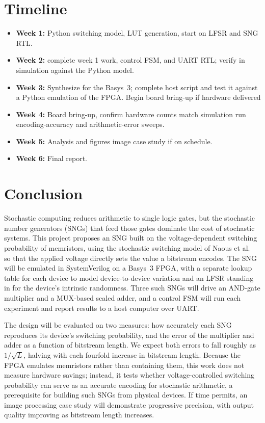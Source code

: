 \documentclass[conference]{IEEEtran}
\begin{document}
\newpage
\section{Timeline}
\begin{itemize}
  \item \textbf{Week 1:} Python switching model, LUT generation, start on  LFSR 
      and SNG RTL.
  \item \textbf{Week 2:} complete week 1 work, control FSM, and UART RTL;
        verify in simulation against the Python model.
  \item \textbf{Week 3:} Synthesize for the Basys~3; complete host script
        and test it against a Python emulation of the FPGA. Begin board
        bring-up if hardware delivered
  \item \textbf{Week 4:} Board bring-up, confirm hardware counts match
        simulation run encoding-accuracy and arithmetic-error sweeps.
  \item \textbf{Week 5:} Analysis and figures image case study if on
        schedule.
  \item \textbf{Week 6:} Final report.
\end{itemize}

\section{Conclusion}
Stochastic computing reduces arithmetic to single logic gates, but the
stochastic number generators (SNGs) that feed those gates dominate the cost
of stochastic systems. This project proposes an SNG built on the
voltage-dependent switching probability of memristors, using the stochastic
switching model of Naous et al.~\cite{memristor_stochasticity} so that the
applied voltage directly sets the value a bitstream encodes. The SNG will be
emulated in SystemVerilog on a Basys~3 FPGA, with a separate lookup table
for each device to model device-to-device variation and an LFSR standing in
for the device's intrinsic randomness. Three such SNGs will drive an
AND-gate multiplier and a MUX-based scaled adder, and a control FSM will run
each experiment and report results to a host computer over UART.

The design will be evaluated on two measures: how accurately each SNG
reproduces its device's switching probability, and the error of the
multiplier and adder as a function of bitstream length. We expect both
errors to fall roughly as $1/\sqrt{L}$, halving with each fourfold increase
in bitstream length. Because the FPGA emulates memristors rather than
containing them, this work does not measure hardware savings; instead, it
tests whether voltage-controlled switching probability can serve as an
accurate encoding for stochastic arithmetic, a prerequisite for building
such SNGs from physical devices. If time permits, an image processing case
study will demonstrate progressive precision, with output quality improving
as bitstream length increases.
\end{document}
